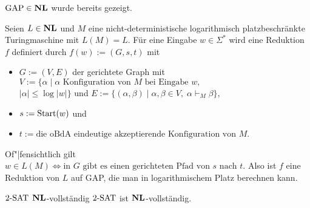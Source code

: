 \begin{Beweis}
    $\text{GAP} \in \mathbf{NL}$ wurde bereits gezeigt.
    
    Seien $L \in \mathbf{NL}$ und $M$ eine nicht-deterministische logarithmisch platzbeschränkte
    Turingmaschine mit $L(M) = L$.
    Für eine Eingabe $w \in \Sigma^\ast$ wird eine Reduktion $f$ definiert durch
    $f(w) := (G, s, t)$ mit
    \begin{itemize}
        \item
        $G := (V, E)$ der gerichtete Graph mit
        $V := \{\alpha \;|\; \alpha \text{ Konfiguration von } M \text{ bei Eingabe } w,$\\
        $|\alpha| \le \log |w|\}$ und
        $E := \{(\alpha, \beta) \;|\; \alpha, \beta \in V,\; \alpha \vdash_M \beta\}$,
        
        \item
        $s := \text{Start}(w)$ und
        
        \item
        $t := \text{die oBdA eindeutige akzeptierende Konfiguration von } M$.
    \end{itemize}
    Of"|fensichtlich gilt $w \in L(M) \iff \text{in } G \text{ gibt es einen gerichteten Pfad von }
    s \text{ nach } t$.
    Also ist $f$ eine Reduktion von $L$ auf GAP, die man in logarithmischem Platz berechnen kann.
\end{Beweis}

\linie
\pagebreak

\begin{Satz}{$2\text{-SAT}$ $\mathbf{NL}$-vollständig}
    $2\text{-SAT}$ ist $\mathbf{NL}$-vollständig.
\end{Satz}

